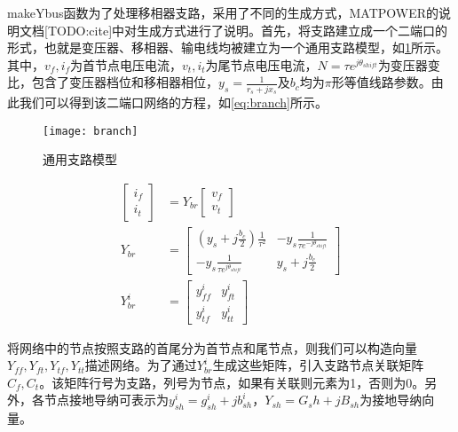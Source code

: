 \documentclass[a4paper,12pt]{article}
\begin{document}
    makeYbus函数为了处理移相器支路，采用了不同的生成方式，MATPOWER的说明文档[TODO:cite]中对生成方式进行了说明。首先，将支路建立成一个二端口的形式，也就是变压器、移相器、输电线均被建立为一个通用支路模型，如\cref{fig:branch}所示。其中，$v_f,i_f$为首节点电压电流，$v_t,i_t$为尾节点电压电流，$N=\tau e^{j\theta_{shift}}$为变压器变比，包含了变压器档位和移相器相位，$y_s=\frac{1}{r_s+j x_s}$及$b_c$均为$\pi$形等值线路参数。由此我们可以得到该二端口网络的方程，如\cref{eq:branch}所示。

    \begin{figure}
      \texttt{[image: branch]}
      \caption{通用支路模型}
      \label{fig:branch}
    \end{figure}
    \begin{equation}
      \label{eq:branch}
      \begin{aligned}
        \begin{bmatrix}
          i_f\\
          i_t
        \end{bmatrix} &= Y_{br}
        \begin{bmatrix}
          v_f\\
          v_t
        \end{bmatrix} \\
        Y_{br} &= \begin{bmatrix}
          (y_s+j\frac{b_c}{2})\frac{1}{\tau^2} & -y_s\frac{1}{\tau e^{-j\theta_{shift}}} \\
          -y_s\frac{1}{\tau e^{j\theta_{shift}}} & y_s+j\frac{b_c}{2}
      \end{bmatrix}\\
      Y_{br}^i &=
      \begin{bmatrix}
        y_{ff}^i & y_{ft}^i\\
        y_{tf}^i & y_{tt}^i
      \end{bmatrix}
      \end{aligned}
    \end{equation}

    将网络中的节点按照支路的首尾分为首节点和尾节点，则我们可以构造向量$Y_{ff},Y_{ft},Y_{tf},Y_{tt}$描述网络。为了通过$Y_{br}^i$生成这些矩阵，引入支路节点关联矩阵$C_f, C_t$。该矩阵行号为支路，列号为节点，如果有关联则元素为1，否则为0。另外，各节点接地导纳可表示为$y_{sh}^i=g_{sh}^i+j b_{sh}^i$，$Y_{sh}=G_sh+jB_{sh}$为接地导纳向量。
\end{document}
